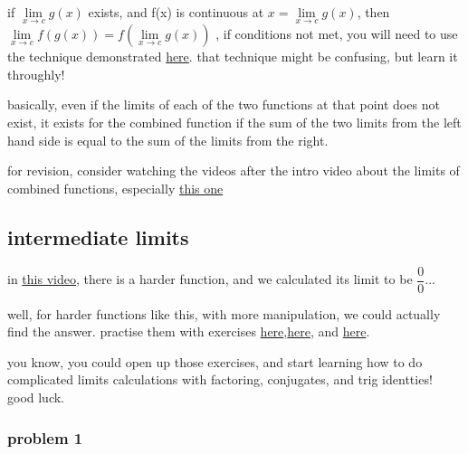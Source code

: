 \documentclass[11pt,a4paper]{article}
\begin{document}
\vspace{20pt}

if $\lim \limits_{x \to c}g(x)$ exists, and f(x) is continuous at $x = \lim \limits_{x \to c}g(x)$, then $\lim \limits_{x \to c} f(g(x)) = f(\lim \limits_{x \to c}g(x))$ , if conditions not met, you will need to use the technique demonstrated \href{https://www.khanacademy.org/math/ap-calculus-ab/ab-limits-new/ab-1-5a/v/limits-of-composite-functions-external-limit-doesn-t-exist}{here}. that technique might be confusing, but learn it throughly!

\vspace{20pt}

basically, even if the limits of each of the two functions at that point does not exist, it exists for the combined function if the sum of the two limits from the left hand side is equal to the sum of the limits from the right.

for revision, consider watching the videos after the intro video about the limits of combined functions, especially \href{https://www.khanacademy.org/math/ap-calculus-ab/ab-limits-new/ab-1-5a/v/limits-of-composite-functions-internal-limit-doesn-t-exist}{this one}

\vspace{30pt}
\subsection{intermediate limits}
in \href{https://www.khanacademy.org/math/ap-calculus-ab/ab-limits-new/ab-1-6/v/limits-by-rationalizing}{this video}, there is a harder function, and we calculated its limit to be $\dfrac{0}{0}$...

well, for harder functions like this, with more manipulation, we could actually find the answer. practise them with exercises \href{https://www.khanacademy.org/math/ap-calculus-ab/ab-limits-new/ab-1-6/e/two-sided-limits-using-algebra}{here},\href{https://www.khanacademy.org/math/ap-calculus-ab/ab-limits-new/ab-1-6/e/limits_2}{here}, and \href{https://www.khanacademy.org/math/ap-calculus-ab/ab-limits-new/ab-1-6/e/find-limits-using-trig-identities}{here}.

you know, you could open up those exercises, and start learning how to do complicated limits calculations with factoring, conjugates, and trig identties! good luck.

\subsubsection{problem 1}
\end{document}
